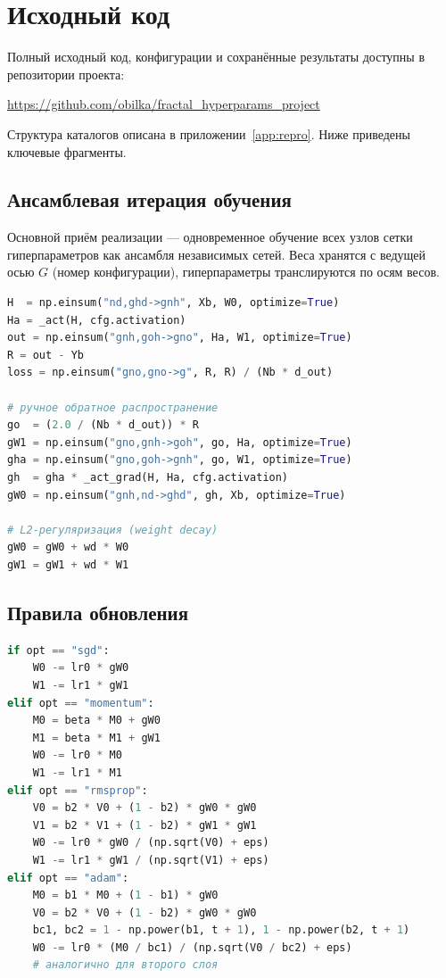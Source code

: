 \section{Исходный код}\label{app:code}

Полный исходный код, конфигурации и сохранённые результаты доступны в
репозитории проекта:
\begin{center}
\url{https://github.com/obilka/fractal_hyperparams_project}
\end{center}
Структура каталогов описана в приложении~\ref{app:repro}.
Ниже приведены ключевые фрагменты.

\subsection{Ансамблевая итерация обучения}

Основной приём реализации --- одновременное обучение всех узлов сетки
гиперпараметров как ансамбля независимых сетей. Веса хранятся с ведущей осью
$G$ (номер конфигурации), гиперпараметры транслируются по осям весов.

\begin{lstlisting}[language=Python,caption={Прямой и обратный проход для ансамбля сетей}]
H  = np.einsum("nd,ghd->gnh", Xb, W0, optimize=True)
Ha = _act(H, cfg.activation)
out = np.einsum("gnh,goh->gno", Ha, W1, optimize=True)
R = out - Yb
loss = np.einsum("gno,gno->g", R, R) / (Nb * d_out)

# ручное обратное распространение
go  = (2.0 / (Nb * d_out)) * R
gW1 = np.einsum("gno,gnh->goh", go, Ha, optimize=True)
gha = np.einsum("gno,goh->gnh", go, W1, optimize=True)
gh  = gha * _act_grad(H, Ha, cfg.activation)
gW0 = np.einsum("gnh,nd->ghd", gh, Xb, optimize=True)

# L2-регуляризация (weight decay)
gW0 = gW0 + wd * W0
gW1 = gW1 + wd * W1
\end{lstlisting}

\subsection{Правила обновления}

\begin{lstlisting}[language=Python,caption={Реализация четырёх оптимизаторов}]
if opt == "sgd":
    W0 -= lr0 * gW0
    W1 -= lr1 * gW1
elif opt == "momentum":
    M0 = beta * M0 + gW0
    M1 = beta * M1 + gW1
    W0 -= lr0 * M0
    W1 -= lr1 * M1
elif opt == "rmsprop":
    V0 = b2 * V0 + (1 - b2) * gW0 * gW0
    V1 = b2 * V1 + (1 - b2) * gW1 * gW1
    W0 -= lr0 * gW0 / (np.sqrt(V0) + eps)
    W1 -= lr1 * gW1 / (np.sqrt(V1) + eps)
elif opt == "adam":
    M0 = b1 * M0 + (1 - b1) * gW0
    V0 = b2 * V0 + (1 - b2) * gW0 * gW0
    bc1, bc2 = 1 - np.power(b1, t + 1), 1 - np.power(b2, t + 1)
    W0 -= lr0 * (M0 / bc1) / (np.sqrt(V0 / bc2) + eps)
    # аналогично для второго слоя
\end{lstlisting}

